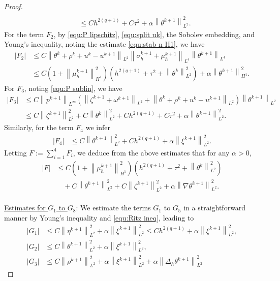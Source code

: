 \documentclass[11pt, reqno]{amsart}
\theoremstyle{definition}
\numberwithin{equation}{section}
\newcommand{\norm}[2]{\left\|{#1}\right\|_{#2}}
\newcommand{\abs}[1]{\left|{#1}\right|}
\begin{document}
\begin{proof}
\begin{align*}
	\\
	&\leq
	Ch^{2(q+1)}+C\tau^2 + \alpha \norm{\theta^{k+1}}{L^2}^2.
\end{align*}
 For the term $F_2$, by \eqref{equ:P lipschitz}, \eqref{equ:split uk}, the Sobolev embedding, and Young's inequality, noting the estimate \eqref{equ:stab n H1}, we have
\begin{align*}
	\abs{F_2} &\leq
	C \norm{\theta^k+\rho^k+u^k-u^{k+1}}{L^2} \norm{\sigma_h^{k+1}+\mu_h^{k+1}}{L^4} \norm{\theta^{k+1}}{L^4}
	\\
	&\leq
	C\left(1+\norm{\mu_h^{k+1}}{H^1}^2\right) \left(h^{2(q+1)}+ \tau^2+ \norm{\theta^k}{L^2}^2 \right)
	+
	\alpha \norm{\theta^{k+1}}{H^1}^2.
\end{align*}
For $F_3$, noting \eqref{equ:P sublin}, we have
\begin{align*}
	\abs{F_3}
	&\leq
	C\norm{p^{k+1}}{L^\infty} \left(\norm{\zeta^{k+1}+\omega^{k+1}}{L^2} + \norm{\theta^k+\rho^k+u^k-u^{k+1}}{L^2} \right) \norm{\theta^{k+1}}{L^2}
	\\
	&\leq
	C \norm{\zeta^{k+1}}{L^2}^2 + C \norm{\theta^k}{L^2}^2 + Ch^{2(q+1)} + C\tau^2 + \alpha \norm{\theta^{k+1}}{L^2}^2.
\end{align*}
Similarly, for the term $F_4$ we infer
\begin{align*}
	\abs{F_4}
	&\leq
	C\norm{\theta^{k+1}}{L^2}^2 + Ch^{2(q+1)} + \alpha \norm{\xi^{k+1}}{L^2}^2.
\end{align*}
Letting $F := \sum_{i=1}^4 F_i$, we deduce from the above estimates that for any $\alpha>0$,
\begin{align}\label{equ:est F}
	\abs{F}
	&\leq
	C\left(1+\norm{\mu_h^{k+1}}{H^1}^2\right) \left(h^{2(q+1)}+ \tau^2+ \norm{\theta^k}{L^2}^2 \right)
	\nonumber\\
	&\quad
	+
	C \norm{\theta^{k+1}}{L^2}^2
	+
	C \norm{\zeta^{k+1}}{L^2}^2
	+
	\alpha \norm{\nabla \theta^{k+1}}{L^2}^2.
\end{align}
\\
\underline{Estimates for $G_1$ to $G_8$}: We estimate the terms $G_1$ to $G_5$ in a straightforward manner by Young's inequality and \eqref{equ:Ritz ineq}, leading to
\begin{align*}
	\abs{G_1}
	&\leq
	{C\norm{\eta^{k+1}}{L^2}^2 + \alpha \norm{\xi^{k+1}}{L^2}^2}
	\leq
	{Ch^{2(q+1)}} + \alpha \norm{\xi^{k+1}}{L^2}^2,
	\\
	\abs{G_2}
	&\leq
	C\norm{\theta^{k+1}}{L^2}^2 + \alpha \norm{\xi^{k+1}}{L^2}^2,
	\\
	\abs{G_3}
	&\leq
	{C\norm{\rho^{k+1}}{L^2}^2 + \alpha \norm{\xi^{k+1}}{L^2}^2 + \alpha \norm{\Delta_h \theta^{k+1}}{L^2}^2}

\end{align*}
\end{proof}
\end{document}
